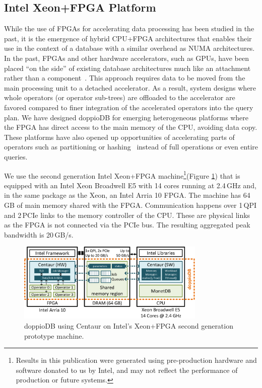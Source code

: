 \documentclass[11pt,dvipdfm]{article}
\newcommand{\dbname}{doppioDB}
\begin{document}



\subsection{Intel Xeon+FPGA Platform}
\label{sec:harp2}

While the use of FPGAs for accelerating data processing has been studied in the past, it is the emergence of hybrid CPU+FPGA architectures that enables their use in the context of a database with a similar overhead as NUMA architectures. In the past, FPGAs and other hardware accelerators, such as GPUs, have been placed ``on the side'' of existing database architectures much like an attachment rather than a component~\cite{ross2015gpu,netezza,jun2015bluedbm}. This approach requires data to be moved from the main processing unit to a detached accelerator. As a result, system designs where whole operators (or operator sub-trees) are offloaded to the accelerator are favored compared to finer integration of the accelerated operators into the query plan. We have designed doppioDB for emerging heterogeneous platforms where the FPGA has direct access to the main memory of the CPU, avoiding data copy. These platforms have also opened up opportunities of accelerating parts of operators such as partitioning or hashing~\cite{kara2017fpga} instead of full operations or even entire queries.

We use the second generation Intel Xeon+FPGA machine\footnote{Results in this publication were generated using pre-production hardware and software donated to us by Intel, and may not reflect the performance of production or future systems.}(Figure \ref{fig:harp-centaur}) that is equipped with an Intel Xeon Broadwell E5 with 14 cores running at 2.4\,GHz and, in the same package as the Xeon, an Intel Arria 10 FPGA. 
The machine has 64\,GB of main memory shared with the FPGA. Communication happens over 1\,QPI and 2\,PCIe links to the memory controller of the CPU. These are physical links as the FPGA is not connected via the PCIe bus. The resulting aggregated peak bandwidth is 20\,GB/s.

\begin{figure}[t]
    \begin{center}
        \includegraphics[width=0.8\textwidth]{figs/doppioDB.eps}
    \end{center}
\vspace{-2em}
	\caption{\dbname{} using Centaur on Intel's Xeon+FPGA second generation prototype machine.}
	\label{fig:harp-centaur}
\end{figure}
\end{document}
